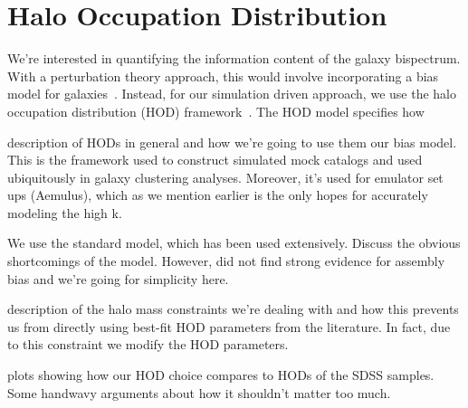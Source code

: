 \section{Halo Occupation Distribution} \label{sec:hod}  
We're interested in quantifying the information content of the galaxy 
bispectrum. With a perturbation theory approach, this would involve 
incorporating a bias model for galaxies~\citep[\emph{e.g.}][]{sefusatti2006, yankelevich2019, chudaykin2019}. 
Instead, for our simulation driven approach, we use the halo occupation 
distribution (HOD) framework~\citep[\emph{e.g.}][]{zheng2005,leauthaud2012,tinker2013,zentner2016,vakili2019}. 
The HOD model specifies how 

\bitem
\item description of HODs in general and how we're going to use them our bias model. 
    This is the framework used to construct simulated mock catalogs and used 
    ubiquitously in galaxy clustering analyses. Moreover, it's used for emulator 
    set ups (Aemulus), which as we mention earlier is the only hopes for accurately 
    modeling the high k.
\item We use the standard \cite{zheng2007} model, which has been used extensively. 
    Discuss the obvious shortcomings of the model. However, \cite{vakili2019} did not 
    find strong evidence for assembly bias and we're going for simplicity here. 
\item description of the halo mass constraints we're dealing with and how this prevents 
    us from directly using best-fit HOD parameters from the literature. In fact, due
    to this constraint we modify the HOD parameters.
\item plots showing how our HOD choice compares to HODs of the SDSS samples. Some handwavy
    arguments about how it shouldn't matter too much. 
\eitem


